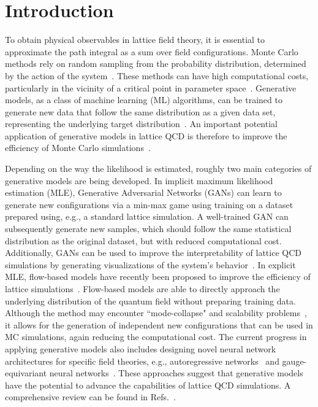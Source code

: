\section{Introduction}

To obtain physical observables in lattice field theory, it is essential to approximate the path integral as a sum over field configurations. Monte Carlo methods rely on random sampling from the probability distribution, determined by the action of the system~\cite{Knechtli:2017sna}. These methods can have high computational costs, particularly in the vicinity of a critical point in parameter space~\cite{Wolff:1989wq}. Generative models, as a class of machine learning (ML) algorithms, can be trained to generate new data that follow the same distribution as a given data set, representing the underlying target distribution~\cite{tomczak:2022deep}.
An important potential application of generative models in lattice QCD is therefore to improve the efficiency of Monte Carlo simulations~\cite{Boyda:2022nmh}.

Depending on the way the likelihood is estimated, roughly two main categories of generative models are being developed. In implicit maximum likelihood estimation (MLE), Generative Adversarial Networks (GANs) can learn to generate new configurations via a min-max game using training on a dataset prepared using, e.g., a standard lattice simulation.
A well-trained GAN can subsequently generate new samples, which should follow the same statistical distribution as the original dataset, but with reduced computational cost. Additionally, GANs can be used to improve the interpretability of lattice QCD simulations by generating visualizations of the system's behavior~\cite{Zhou:2018ill,Pawlowski:2018qxs}.
In explicit MLE, flow-based models have recently been proposed to improve the efficiency of lattice simulations~\cite{ Albergo:2019eim,  Kanwar:2020xzo, Nicoli:2020njz,Albergo:2021bna, Albergo:2021vyo, DelDebbio:2021qwf, Hackett:2021idh, Albergo:2022qfi, Bacchio:2022vje, Caselle:2022acb, Chen:2022ytr, Gerdes:2022eve, Albandea:2023wgd, Singha:2023cql}. Flow-based models are able to directly approach the underlying distribution of the quantum field without preparing training data. Although the method may encounter ``mode-collapse" and scalability problems~\cite{Abbott:2022zsh,Nicoli:2023qsl}, it allows for the generation of independent new configurations that can be used in MC simulations, again reducing the computational cost. The current progress in applying generative models also includes designing novel neural network architectures for specific field theories, e.g., autoregressive networks~\cite{Wang:2020hji,Luo:2023opo} and gauge-equivariant neural networks~\cite{Favoni:2020reg, Kanwar:2020xzo, Aronsson:2023rli, Abbott:2022zhs, Gerdes:2022eve,Luo:2023opo}. These approaches suggest that generative models have the potential to advance the capabilities of lattice QCD simulations. A comprehensive review can be found in Refs.~\cite{Zhou:2023pti, He:2023zin}.


